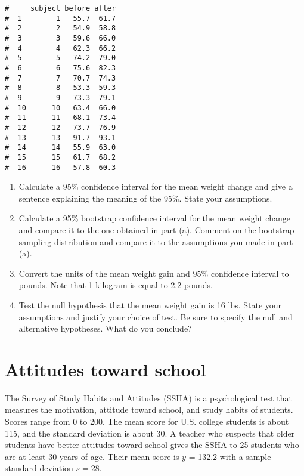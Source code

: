 \documentclass[letterpaper,9pt,twoside,printwatermark=false]{pinp}
\providecommand{\tightlist}{%
  \setlength{\itemsep}{0pt}\setlength{\parskip}{0pt}}
\begin{document}
\begin{ShadedResult}
\begin{verbatim}
#     subject before after
#  1        1   55.7  61.7
#  2        2   54.9  58.8
#  3        3   59.6  66.0
#  4        4   62.3  66.2
#  5        5   74.2  79.0
#  6        6   75.6  82.3
#  7        7   70.7  74.3
#  8        8   53.3  59.3
#  9        9   73.3  79.1
#  10      10   63.4  66.0
#  11      11   68.1  73.4
#  12      12   73.7  76.9
#  13      13   91.7  93.1
#  14      14   55.9  63.0
#  15      15   61.7  68.2
#  16      16   57.8  60.3
\end{verbatim}
\end{ShadedResult}

\begin{enumerate}
\def\labelenumi{\alph{enumi}.}
\tightlist
\item
  Calculate a 95\% confidence interval for the mean weight change and
  give a sentence explaining the meaning of the 95\%. State your
  assumptions.
\item
  Calculate a 95\% bootstrap confidence interval for the mean weight
  change and compare it to the one obtained in part (a). Comment on the
  bootstrap sampling distribution and compare it to the assumptions you
  made in part (a).
\item
  Convert the units of the mean weight gain and 95\% confidence interval
  to pounds. Note that 1 kilogram is equal to 2.2 pounds.
\item
  Test the null hypothesis that the mean weight gain is 16 lbs. State
  your assumptions and justify your choice of test. Be sure to specify
  the null and alternative hypotheses. What do you conclude?
\end{enumerate}

\newpage

\section{Attitudes toward school}\label{attitudes-toward-school}

The Survey of Study Habits and Attitudes (SSHA) is a psychological test
that measures the motivation, attitude toward school, and study habits
of students. Scores range from 0 to 200. The mean score for U.S. college
students is about 115, and the standard deviation is about 30. A teacher
who suspects that older students have better attitudes toward school
gives the SSHA to 25 students who are at least 30 years of age. Their
mean score is \(\bar{y}\) = 132.2 with a sample standard deviation
\(s = 28\).
\end{document}
